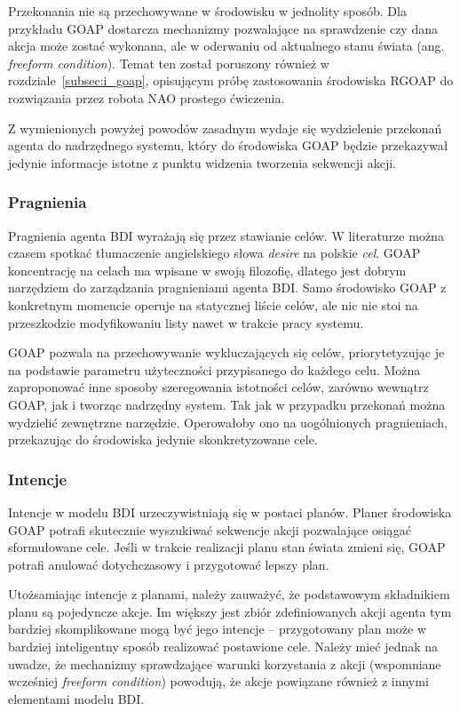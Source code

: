 Przekonania nie są przechowywane w środowisku w jednolity sposób. Dla przykładu GOAP dostarcza mechanizmy pozwalające na sprawdzenie czy dana akcja może zostać wykonana, ale w oderwaniu od aktualnego stanu świata (ang. \textit{freeform condition}). Temat ten został poruszony również w rozdziale~\ref{subsec:i_goap}, opisującym próbę zastosowania środowiska RGOAP do rozwiązania przez robota NAO prostego ćwiczenia.

Z wymienionych powyżej powodów zasadnym wydaje się wydzielenie przekonań agenta do nadrzędnego systemu, który do środowiska GOAP będzie przekazywał jedynie informacje istotne z punktu widzenia tworzenia sekwencji akcji.

\subsubsection{Pragnienia}
Pragnienia agenta BDI wyrażają się przez stawianie celów. W literaturze można czasem spotkać tłumaczenie angielskiego słowa \textit{desire} na polskie \textit{cel}. GOAP koncentrację na celach ma wpisane w swoją filozofię, dlatego jest dobrym narzędziem do zarządzania pragnieniami agenta BDI. Samo środowisko GOAP z konkretnym momencie operuje na statycznej liście celów, ale nic nie stoi na przeszkodzie modyfikowaniu listy nawet w trakcie pracy systemu. 

GOAP pozwala na przechowywanie wykluczających się celów, priorytetyzując je na podstawie parametru użyteczności przypisanego do każdego celu. Można zaproponować inne sposoby szeregowania istotności celów, zarówno wewnątrz GOAP, jak i tworząc nadrzędny system. Tak jak w przypadku przekonań można wydzielić zewnętrzne narzędzie. Operowałoby ono na uogólnionych pragnieniach, przekazując do środowiska jedynie skonkretyzowane cele.

\subsubsection{Intencje}
Intencje w modelu BDI urzeczywistniają się w postaci planów. Planer środowiska GOAP potrafi skutecznie wyszukiwać sekwencje akcji pozwalające osiągać sformułowane cele. Jeśli w trakcie realizacji planu stan świata zmieni się, GOAP potrafi anulować dotychczasowy i przygotować lepszy plan. 

Utożsamiając intencje z planami, należy zauważyć, że podstawowym składnikiem planu są pojedyncze akcje. Im większy jest zbiór zdefiniowanych akcji agenta tym bardziej skomplikowane mogą być jego intencje – przygotowany plan może w bardziej inteligentny sposób realizować postawione cele. Należy mieć jednak na uwadze, że mechanizmy sprawdzające warunki korzystania z akcji (wspomniane wcześniej \textit{freeform condition}) powodują, że akcje powiązane również z innymi elementami modelu BDI.

